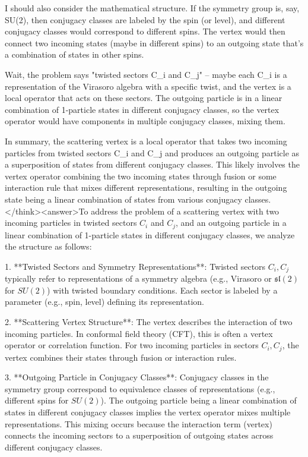 I should also consider the mathematical structure. If the symmetry group is, say, SU(2), then conjugacy classes are labeled by the spin (or level), and different conjugacy classes would correspond to different spins. The vertex would then connect two incoming states (maybe in different spins) to an outgoing state that's a combination of states in other spins.

Wait, the problem says "twisted sectors C_i and C_j" – maybe each C_i is a representation of the Virasoro algebra with a specific twist, and the vertex is a local operator that acts on these sectors. The outgoing particle is in a linear combination of 1-particle states in different conjugacy classes, so the vertex operator would have components in multiple conjugacy classes, mixing them.

In summary, the scattering vertex is a local operator that takes two incoming particles from twisted sectors C_i and C_j and produces an outgoing particle as a superposition of states from different conjugacy classes. This likely involves the vertex operator combining the two incoming states through fusion or some interaction rule that mixes different representations, resulting in the outgoing state being a linear combination of states from various conjugacy classes.</think><answer>To address the problem of a scattering vertex with two incoming particles in twisted sectors \( C_i \) and \( C_j \), and an outgoing particle in a linear combination of 1-particle states in different conjugacy classes, we analyze the structure as follows:  

1. **Twisted Sectors and Symmetry Representations**: Twisted sectors \( C_i, C_j \) typically refer to representations of a symmetry algebra (e.g., Virasoro or \( \mathfrak{sl}(2)\) for \( SU(2) \)) with twisted boundary conditions. Each sector is labeled by a parameter (e.g., spin, level) defining its representation.  

2. **Scattering Vertex Structure**: The vertex describes the interaction of two incoming particles. In conformal field theory (CFT), this is often a vertex operator or correlation function. For two incoming particles in sectors \( C_i, C_j \), the vertex combines their states through fusion or interaction rules.  

3. **Outgoing Particle in Conjugacy Classes**: Conjugacy classes in the symmetry group correspond to equivalence classes of representations (e.g., different spins for \( SU(2) \)). The outgoing particle being a linear combination of states in different conjugacy classes implies the vertex operator mixes multiple representations. This mixing occurs because the interaction term (vertex) connects the incoming sectors to a superposition of outgoing states across different conjugacy classes.  

